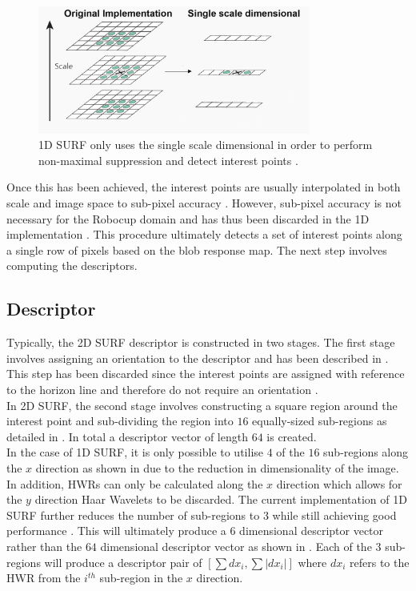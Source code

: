 \begin{figure}[h!] 
  \centering
    \includegraphics[width=0.8\textwidth]{../Drawings/methods/SURF1D_Nonmaximal_suppression.jpg}
    \caption{1D SURF only uses the single scale dimensional in order to perform non-maximal suppression and detect interest points \citep{Anderson}.}
    \label{fig:singleScale}
\end{figure}

Once this has been achieved, the interest points are usually interpolated in both scale and image space to sub-pixel accuracy \citep{Evans2009}. However, sub-pixel accuracy is not necessary for the Robocup domain and has thus been discarded in the 1D implementation \citep{Anderson}. This procedure ultimately detects a set of interest points along a single row of pixels based on the blob response map. The next step involves computing the descriptors.\\  

\subsection{Descriptor}
\label{sec:1dsurfDescribe}
Typically, the 2D SURF descriptor is constructed in two stages. The first stage involves assigning an orientation to the descriptor and has been described in . This step has been discarded since the interest points are assigned with reference to the horizon line and therefore do not require an orientation \cite{Anderson}.\\

In 2D SURF, the second stage involves constructing a square region around the interest point and sub-dividing the region into $16$ equally-sized sub-regions as detailed in . In total a descriptor vector of length $64$ is created.\\

In the case of 1D SURF, it is only possible to utilise $4$ of the $16$ sub-regions along the $x$ direction as shown in  due to the reduction in dimensionality of the image. In addition, HWRs can only be calculated along the $x$ direction which allows for the $y$ direction Haar Wavelets to be discarded. The current implementation of 1D SURF further reduces the number of sub-regions to $3$ while still achieving good performance \citep{Anderson}. This will ultimately produce a $6$ dimensional descriptor vector rather than the $64$ dimensional descriptor vector as shown in . Each of the $3$ sub-regions will produce a descriptor pair of $[\sum dx_i, \sum |dx_i|]$ where $dx_i$ refers to the HWR from the $i^{th}$ sub-region in the $x$ direction. \\

